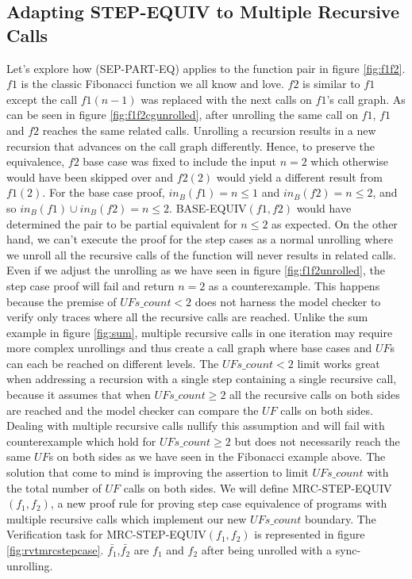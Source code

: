 \subsection{Adapting STEP-EQUIV to Multiple Recursive Calls}
\label{sec:adaptstep}
Let's explore how (SEP-PART-EQ) applies to the function pair in figure \ref{fig:f1f2}.
$f1$ is the classic Fibonacci function we all know and love. $f2$ is similar to $f1$ except the call $f1(n-1)$ was replaced with the next calls on $f1$'s call graph. As can be seen in figure \ref{fig:f1f2cgunrolled}, after unrolling the same call on $f1$, $f1$ and $f2$ reaches the same related calls. Unrolling a recursion results in a new recursion that advances on the call graph differently. Hence, to preserve the equivalence, $f2$ base case was fixed to include the input $n=2$ which otherwise would have been skipped over and $f2(2)$ would yield a different result from $f1(2)$. 
For the base case proof, $in_B(f1) = {n \leq 1}$ and  $in_B(f2) = {n \leq 2}$, and so $in_B(f1) \cup in_B(f2) = {n \leq 2} $. BASE-EQUIV$(f1,f2)$ would have determined the pair to be partial equivalent for ${n \leq 2}$ as expected. On the other hand, we can't  execute the proof for the step cases as a normal unrolling where we unroll all the recursive calls of the function will never results in related calls. Even if we adjust the unrolling as we have seen in figure \ref{fig:f1f2unrolled}, the step case proof will fail and return $n=2$ as a counterexample. This happens because the premise of $UFs\_count < 2$ does not harness the model checker to verify only traces where all the recursive calls are reached. Unlike the sum example in figure \ref{fig:sum}, multiple recursive calls in one iteration may require more complex unrollings and thus create a call graph where base cases and $UF$s can each be reached on different levels. The $UFs\_count < 2$ limit works great when addressing a recursion with a single step containing a single recursive call, because it assumes that when $UFs\_count \geq 2$ all the recursive calls on both sides are reached and the model checker can compare the $UF$ calls on both sides. Dealing with multiple recursive calls nullify this assumption and will fail with counterexample which hold for $UFs\_count \geq 2$ but does not necessarily reach the same $UF$s on both sides as we have seen in the Fibonacci example above.
The solution that come to mind is improving the assertion to limit $UFs\_count$ with the total number of $UF$ calls on both sides. We will define MRC-STEP-EQUIV$(f_1,f_2)$, a new proof rule for proving step case equivalence of programs with multiple recursive calls which implement our new $UFs\_count$ boundary. The Verification task for MRC-STEP-EQUIV$(f_1,f_2)$ is represented in figure \ref{fig:rvtmrcstepcase}. $\bar{f_1}$,$\bar{f_2}$ are $f_1$ and $f_2$ after being unrolled with a sync-unrolling.
